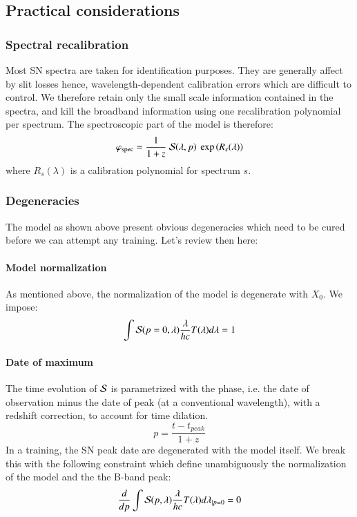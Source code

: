 \documentclass{aa}
\begin{document}
\subsection{Practical considerations}

\subsubsection{Spectral recalibration}

Most SN spectra are taken for identification purposes.  They are
generally affect by slit losses hence, wavelength-dependent
calibration errors which are difficult to control. We therefore retain
only the small scale information contained in the spectra, and kill
the broadband information using one recalibration polynomial per
spectrum. The spectroscopic part of the model is therefore:
\begin{equation}
  \varphi_{\mathrm{spec}} = \frac{1}{1+z}\ {\cal S}(\lambda, p)\ \exp\left(R_s(\lambda)\right)
\end{equation}
where $R_s(\lambda)$ is a calibration polynomial for spectrum $s$.

\subsubsection{Degeneracies}

The model as shown above present obvious degeneracies which need to be
cured before we can attempt any training. Let's review then here: 

\paragraph{Model normalization} As mentioned above, the normalization of the model
is degenerate with $X_0$. We impose:
\begin{equation}
  \int {\cal S}(p=0,\lambda) \frac{\lambda}{hc} T(\lambda) d\lambda = 1
\end{equation}

\paragraph{Date of maximum} The time evolution of $\cal S$ is parametrized with the phase, i.e. the date of observation
minus the date of peak (at a conventional wavelength), with a redshift
correction, to account for time dilation.
\begin{equation}
  p = \frac{t - t_{peak}}{1+z}
\end{equation}
In a training, the SN peak date are degenerated with the model itself.
We break this with the following constraint which define unambiguously
the normalization of the model and the the B-band peak:
\begin{equation}
  \frac{d}{dp}\int {\cal S}(p,\lambda) \frac{\lambda}{hc} T(\lambda) d\lambda_{|p=0} = 0
\end{equation}
\end{document}
